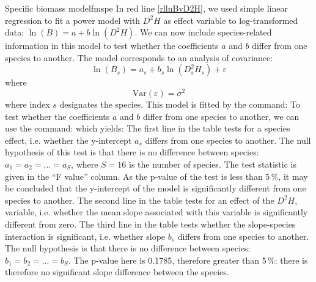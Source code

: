 \begin{filrouge}{Specific biomass model}{fmspe}
In red line \ref{rllnBvD2H}, we used simple linear regression to fit a power model with $D^2H$ as effect variable to log-transformed data: $\ln(B)=a+b\ln(D^2H)$. We can now include species-related information in this model to test whether the coefficients $a$ and $b$ differ from one species to another. The model corresponds to an analysis of covariance:
\[
\ln(B_s)=a_s+b_s\ln(D_s^2H_s)+\varepsilon
\]
where
\[
\mathrm{Var}(\varepsilon)=\sigma^2
\]
where index $s$ designates the species. This model is fitted by the command:
%
To test whether the coefficients $a$ and $b$ differ from one species to another, we can use the command:
%
which yields:
%
The first line in the table tests for a species effect, i.e. whether the y-intercept $a_s$ differs from one species to another. The null hypothesis of this test is that there is no difference between species: $a_1=a_2=\ldots=a_S$, where $S=16$ is the number of species. The test statistic is given in the ``F value'' column. As the p-value of the test is less than 5\,\%, it may be concluded that the y-intercept of the model is significantly different from one species to another. The second line in the table tests for an effect of the $D^2H$, variable, i.e. whether the mean slope associated with this variable is significantly different from zero. The third line in the table tests whether the slope-species interaction is significant, i.e. whether slope $b_s$ differs from one species to another. The null hypothesis is that there is no difference between species: $b_1=b_2=\ldots=b_S$. The p-value here is 0.1785, therefore greater than 5\,\%: there is therefore no significant slope difference between the species.


\end{filrouge}
